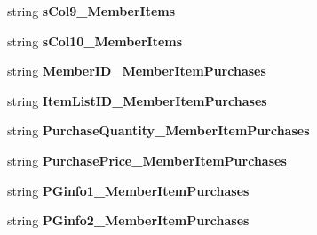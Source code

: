 \begin{DoxyCompactItemize}
\item 
string {\bfseries s\+Col9\+\_\+\+Member\+Items}\hypertarget{a00124_a84810571c747f5ab838ed971fecf3095}{}\label{a00124_a84810571c747f5ab838ed971fecf3095}

\item 
string {\bfseries s\+Col10\+\_\+\+Member\+Items}\hypertarget{a00124_a048789e13b89a937558042b550d7065a}{}\label{a00124_a048789e13b89a937558042b550d7065a}

\item 
string {\bfseries Member\+I\+D\+\_\+\+Member\+Item\+Purchases}\hypertarget{a00124_a5c522d0059870b90fe8a4cc971952255}{}\label{a00124_a5c522d0059870b90fe8a4cc971952255}

\item 
string {\bfseries Item\+List\+I\+D\+\_\+\+Member\+Item\+Purchases}\hypertarget{a00124_a15a9e7eb027ea759dbcfb109dd96f9d4}{}\label{a00124_a15a9e7eb027ea759dbcfb109dd96f9d4}

\item 
string {\bfseries Purchase\+Quantity\+\_\+\+Member\+Item\+Purchases}\hypertarget{a00124_ab4b09fd7c392b4b51029e335a30d0376}{}\label{a00124_ab4b09fd7c392b4b51029e335a30d0376}

\item 
string {\bfseries Purchase\+Price\+\_\+\+Member\+Item\+Purchases}\hypertarget{a00124_a2022ebf20f447de3a3cadc3fdcf5913a}{}\label{a00124_a2022ebf20f447de3a3cadc3fdcf5913a}

\item 
string {\bfseries P\+Ginfo1\+\_\+\+Member\+Item\+Purchases}\hypertarget{a00124_a66f5ef2c884041743873fd489f273681}{}\label{a00124_a66f5ef2c884041743873fd489f273681}

\item 
string {\bfseries P\+Ginfo2\+\_\+\+Member\+Item\+Purchases}\hypertarget{a00124_a4f66c6aaceb78859cb5634a97cb4d0e9}{}\label{a00124_a4f66c6aaceb78859cb5634a97cb4d0e9}


\end{DoxyCompactItemize}
